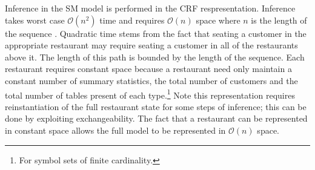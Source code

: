 Inference in the SM model is performed in the CRF respresentation. Inference takes worst case $\mathcal{O}(n^2)$ time and requires $\mathcal{O}(n)$ space where $n$ is the length of the sequence  \cite{Gasthaus2010}. Quadratic time stems from the fact that seating a customer in the appropriate restaurant may require seating a customer in all of the restaurants above it.  The length of this path is bounded by the length of the sequence. Each restaurant requires constant space because a restaurant need only maintain a constant number of summary statistics, the total number of customers and the total number of tables present of each type.\footnote{For symbol sets of finite cardinality.} Note this representation requires reinstantiation of the full restaurant state for some steps of inference; this can be done by exploiting exchangeability.  The fact that a restaurant can be represented in constant space allows the full model to be represented in $\mathcal{O}(n)$ space.

